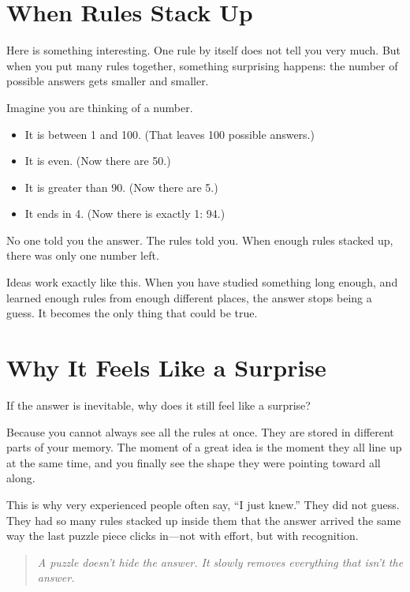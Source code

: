 \documentclass[12pt]{book}
\begin{document}
\section{When Rules Stack Up}

Here is something interesting. One rule by itself does not tell you very
much. But when you put many rules together, something surprising happens:
the number of possible answers gets smaller and smaller.

Imagine you are thinking of a number.
\begin{itemize}
\item It is between 1 and 100. (That leaves 100 possible answers.)
\item It is even. (Now there are 50.)
\item It is greater than 90. (Now there are 5.)
\item It ends in 4. (Now there is exactly 1: 94.)
\end{itemize}

No one told you the answer. The rules told you. When enough rules stacked
up, there was only one number left.

Ideas work exactly like this. When you have studied something long enough,
and learned enough rules from enough different places, the answer stops
being a guess. It becomes the only thing that could be true.

\section{Why It Feels Like a Surprise}

If the answer is inevitable, why does it still feel like a surprise?

Because you cannot always see all the rules at once. They are stored in
different parts of your memory. The moment of a great idea is the moment
they all line up at the same time, and you finally see the shape they were
pointing toward all along.

This is why very experienced people often say, ``I just knew.'' They did
not guess. They had so many rules stacked up inside them that the answer
arrived the same way the last puzzle piece clicks in---not with effort,
but with recognition.

\begin{quote}\itshape
A puzzle doesn't hide the answer.
It slowly removes everything that isn't the answer.
\end{quote}
\end{document}
